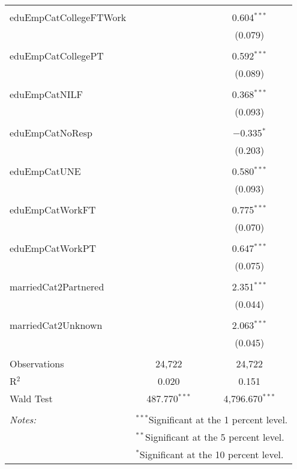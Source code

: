 \begin{table}[!htbp]
\begin{tabular}{@{\extracolsep{1pt}}lcc}
  & & \\ 
 eduEmpCatCollegeFTWork &  & 0.604$^{***}$ \\ 
  &  & (0.079) \\ 
  & & \\ 
 eduEmpCatCollegePT &  & 0.592$^{***}$ \\ 
  &  & (0.089) \\ 
  & & \\ 
 eduEmpCatNILF &  & 0.368$^{***}$ \\ 
  &  & (0.093) \\ 
  & & \\ 
 eduEmpCatNoResp &  & $-$0.335$^{*}$ \\ 
  &  & (0.203) \\ 
  & & \\ 
 eduEmpCatUNE &  & 0.580$^{***}$ \\ 
  &  & (0.093) \\ 
  & & \\ 
 eduEmpCatWorkFT &  & 0.775$^{***}$ \\ 
  &  & (0.070) \\ 
  & & \\ 
 eduEmpCatWorkPT &  & 0.647$^{***}$ \\ 
  &  & (0.075) \\ 
  & & \\ 
 marriedCat2Partnered &  & 2.351$^{***}$ \\ 
  &  & (0.044) \\ 
  & & \\ 
 marriedCat2Unknown &  & 2.063$^{***}$ \\ 
  &  & (0.045) \\ 
  & & \\ 
Observations & 24,722 & 24,722 \\ 
R$^{2}$ & 0.020 & 0.151 \\ 
Wald Test & 487.770$^{***}$ & 4,796.670$^{***}$ \\ 
\hline \\[-1.8ex] 
\textit{Notes:} & \multicolumn{2}{l}{$^{***}$Significant at the 1 percent level.} \\ 
 & \multicolumn{2}{l}{$^{**}$Significant at the 5 percent level.} \\ 
 & \multicolumn{2}{l}{$^{*}$Significant at the 10 percent level.} \\ 
\end{tabular} 
\end{table} 
